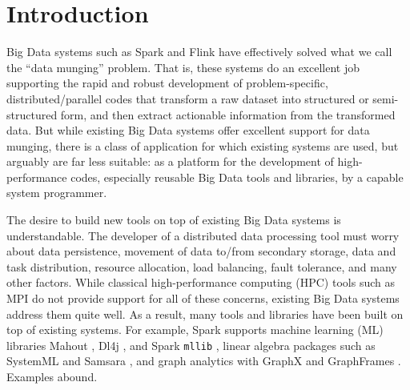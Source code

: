 
\section{Introduction}
Big Data systems such as Spark \cite{zaharia2010spark} and Flink \cite{alexandrov2014stratosphere, carbone2015apache}
have effectively solved what we call the ``data munging'' problem.  That is, 
these systems do an excellent job supporting the rapid
and robust development of problem-specific,
distributed/parallel codes that transform a raw dataset into structured 
or semi-structured form, and then
extract actionable information from the transformed data.
But while existing Big Data systems offer
excellent support for data munging,
there is a class of application for which 
existing systems are 
used, but arguably are far less suitable:
as a platform 
for the development of high-performance codes, especially reusable
Big Data tools and libraries, by a capable
system programmer.

The desire to build new tools
on top of existing Big Data systems is understandable.  
The  developer of a distributed data processing tool must worry about data persistence, movement of
data to/from secondary storage, data
and task distribution, resource allocation, load balancing, fault tolerance, and many other factors.
While classical high-performance computing (HPC)
tools such as MPI \cite{gropp1996high} do not provide support for all of these concerns,
existing Big Data systems 
address them quite well.
As a result, many tools and libraries have been built on top of existing systems.  For example,
Spark supports
machine learning (ML) libraries Mahout \cite{mahout}, Dl4j \cite{dj4j}, 
and Spark \texttt{mllib} \cite{meng2016mllib}, linear algebra packages such as SystemML \cite{tian2012scalable, boehm2016systemml, ghoting2011systemml, boehm2014hybrid} and Samsara \cite{samsara}, and graph analytics with
GraphX \cite{gonzalez2014graphx} and GraphFrames
\cite{dave2016graphframes}.  Examples abound.

